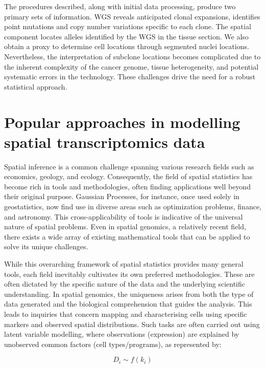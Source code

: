 The procedures described, along with initial data processing, produce two primary sets of information. WGS reveals anticipated clonal expansions, identifies point mutations and copy number variations specific to each clone. The spatial component locates alleles identified by the WGS in the tissue section. We also obtain a proxy to determine cell locations through segmented nuclei locations. Nevertheless, the interpretation of subclone locations becomes complicated due to the inherent complexity of the cancer genome, tissue heterogeneity, and potential systematic errors in the technology. These challenges drive the need for a robust statistical approach.

\section{Popular approaches in modelling spatial transcriptomics data}

Spatial inference is a common challenge spanning various research fields such as economics, geology, and ecology. Consequently, the field of spatial statistics has become rich in tools and methodologies, often finding applications well beyond their original purpose. Gaussian Processes, for instance, once used solely in geostatistics, now find use in diverse areas such as optimization problems, finance, and astronomy. This cross-applicability of tools is indicative of the universal nature of spatial problems. Even in spatial genomics, a relatively recent field, there exists a wide array of existing mathematical tools that can be applied to solve its unique challenges.

While this overarching framework of spatial statistics provides many general tools, each field inevitably cultivates its own preferred methodologies. These are often dictated by the specific nature of the data and the underlying scientific understanding. In spatial genomics, the uniqueness arises from both the type of data generated and the biological comprehension that guides the analysis. This leads to inquiries that concern mapping and characterising cells using specific markers and observed spatial distributions. Such tasks are often carried out using latent variable modelling, where observations (expression) are explained by unobserved common factors (cell types/programs), as represented by:

\begin{equation}
D_i \sim f(k_i)
\end{equation}


